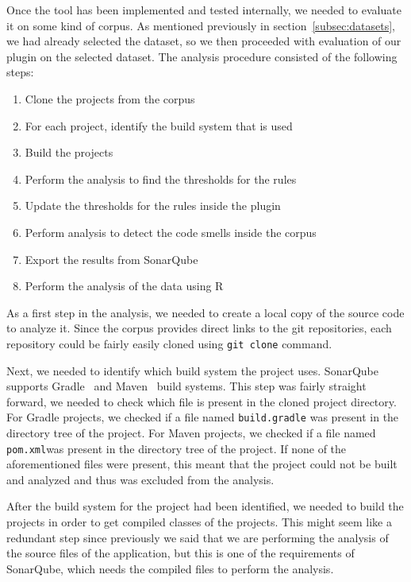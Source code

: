 
Once the tool has been implemented and tested internally, we needed to evaluate it on some kind of corpus.
As mentioned previously in section~\ref{subsec:datasets}, we had already selected the dataset, so we then proceeded with
evaluation of our plugin on the selected dataset.
The analysis procedure consisted of the following steps:
\begin{enumerate}
    \item Clone the projects from the corpus
    \item For each project, identify the build system that is used
    \item Build the projects
    \item Perform the analysis to find the thresholds for the rules
    \item Update the thresholds for the rules inside the plugin
    \item Perform analysis to detect the code smells inside the corpus
    \item Export the results from SonarQube
    \item Perform the analysis of the data using R
\end{enumerate}

As a first step in the analysis, we needed to create a local copy of the source code to analyze it.
Since the corpus provides direct links to the git repositories, each repository could be fairly easily cloned
using \verb|git clone| command.

Next, we needed to identify which build system the project uses.
SonarQube supports Gradle~\cite{gradle} and Maven~\cite{maven} build systems.
This step was fairly straight forward, we needed to check which file is present in the cloned project
directory.
For Gradle projects, we checked if a file named \verb|build.gradle| was present in the directory tree of the project.
For Maven projects, we checked if a file named \verb|pom.xml|was present in the directory tree of the project.
If none of the aforementioned files were present, this meant that the project could not be built and analyzed and thus
was excluded from the analysis.

After the build system for the project had been identified, we needed to build the projects in order
to get compiled classes of the projects.
This might seem like a redundant step since previously we said that we are performing the analysis of the source
files of the application, but this is one of the requirements of SonarQube, which needs the compiled files to
perform the analysis.


